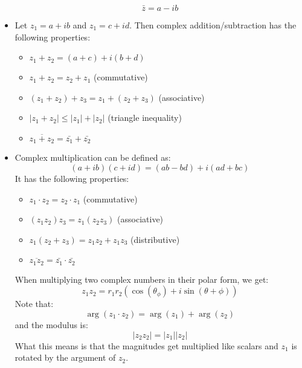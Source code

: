 \begin{itemize}
    \begin{equation}
        \bar{z} = a - ib
        \label{eq:}
    \end{equation}
    \item Let $z_1=a+ib$ and $z_1=c+id$. Then complex addition/subtraction has the following properties:
    \begin{itemize}
        \item $z_1+z_2 = (a+c) + i(b+d)$
        \item $z_1+z_2 = z_2+z_1$ (commutative)
        \item $(z_1+z_2)+z_3=z_1+(z_2+z_3)$ (associative)
        \item $|z_1+z_2| \le |z_1| + |z_2|$ (triangle inequality)
        \item $\overline{z_1+z_2} = \bar{z_1}+\bar{z_2}$
    \end{itemize}
    \item Complex multiplication can be defined as:
    \begin{equation}
        (a+ib)(c+id) = (ab-bd)+i(ad+bc)
        \label{eq:}
    \end{equation}
    It has the following properties:
    \begin{itemize}
        \item $z_1 \cdot z_2 = z_2 \cdot z_1$ (commutative)
        \item $(z_1 z_2) z_3 = z_1(z_2z_3)$ (associative)
        \item $z_1(z_2+z_3) = z_1z_2+z_1z_3$ (distributive)
        \item $\overline{z_1z_2} = \bar{z_1} \cdot \bar{z_2}$
    \end{itemize}
    \begin{idea}
        When multiplying two complex numbers in their polar form, we get:
        \begin{equation}
            z_1z_2 = r_1r_2\left(\cos(\theta_\phi)+i\sin(\theta+\phi)\right)
            \label{eq:}
        \end{equation}
        Note that:
        \begin{equation}
            \arg(z_1 \cdot z_2) = \arg(z_1) + \arg(z_2)
            \label{eq:}
        \end{equation}
        and the modulus is:
        \begin{equation}
            |z_2z_2| = |z_1||z_2|
            \label{eq:}
        \end{equation}
        What this means is that the magnitudes get multiplied like scalars and $z_1$ is rotated by the argument of $z_2$.

\end{idea}
\end{itemize}
